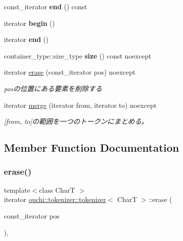 \begin{DoxyCompactItemize}
const\+\_\+iterator {\bfseries end} () const
\item 
\mbox{\label{classouchi_1_1tokenizer_1_1tokenizer_aa016ca0913cb008a3aefbc5c572d9fb8}} 
iterator {\bfseries begin} ()
\item 
\mbox{\label{classouchi_1_1tokenizer_1_1tokenizer_a98cb58904c4d117f9ae0534165d7929e}} 
iterator {\bfseries end} ()
\item 
\mbox{\label{classouchi_1_1tokenizer_1_1tokenizer_a370f088f2374f1cfebc8ead7d9396c6e}} 
container\+\_\+type\+::size\+\_\+type {\bfseries size} () const noexcept
\item 
iterator \mbox{\hyperlink{classouchi_1_1tokenizer_1_1tokenizer_ac816558091f26b8b10535f05cea6a5ed}{erase}} (const\+\_\+iterator pos) noexcept
\begin{DoxyCompactList}\small\item\em posの位置にある要素を削除する \end{DoxyCompactList}\item 
iterator \mbox{\hyperlink{classouchi_1_1tokenizer_1_1tokenizer_a7ea0961e45bc0c083dd9b0c19c9232f0}{merge}} (iterator from, iterator to) noexcept
\begin{DoxyCompactList}\small\item\em \mbox{[}from, to\mbox{]}の範囲を一つのトークンにまとめる。 \end{DoxyCompactList}\end{DoxyCompactItemize}


\subsection{Member Function Documentation}
\mbox{\label{classouchi_1_1tokenizer_1_1tokenizer_ac816558091f26b8b10535f05cea6a5ed}} 
\subsubsection{\texorpdfstring{erase()}{erase()}}
{\footnotesize\ttfamily template$<$class CharT $>$ \\
iterator \mbox{\hyperlink{classouchi_1_1tokenizer_1_1tokenizer}{ouchi\+::tokenizer\+::tokenizer}}$<$ CharT $>$\+::erase (\begin{DoxyParamCaption}\item[{const\+\_\+iterator}]{pos }\end{DoxyParamCaption})\hspace{0.3cm}{\ttfamily [inline]}, {\ttfamily [noexcept]}}



